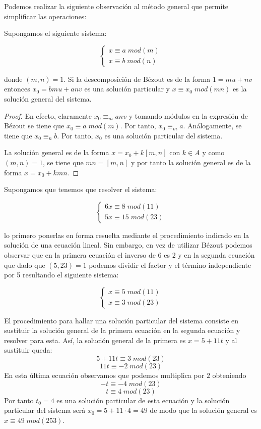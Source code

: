 Podemos realizar la siguiente observación al método general que permite simplificar las operaciones:

\begin{proposition}
Supongamos el siguiente sistema:

\[   
\begin{cases}
x \equiv a \; mod(m) \\
x \equiv b \; mod(n) 
\end{cases}
\]

donde $(m,n) = 1$. Si la descomposición de Bézout es de la forma $1 = mu + nv$ entonces $x_0 = bmu + anv$ es una solución particular y $x \equiv x_0 \; mod(mn)$ es la solución general del sistema. 
\end{proposition}
\begin{proof}
En efecto, claramente $x_0 \equiv_{m} anv$ y tomando módulos en la expresión de Bézout se tiene que $x_0 \equiv a \; mod(m)$. Por tanto, $x_0 \equiv_{m} a$. Análogamente, se tiene que $x_0 \equiv_{n} b$. Por tanto, $x_0$ es una solución particular del sistema. 

La solución general es de la forma $x = x_0 + k[m,n]$ con $k \in A$ y como $(m,n) = 1$, se tiene que $mn = [m,n]$ y por tanto la solución general es de la forma $x = x_0 + kmn$. 
\end{proof}

\begin{example}
Supongamos que tenemos que resolver el sistema:

\[   
\begin{cases}
6x \equiv 8 \; mod(11) \\
5x \equiv 15 \; mod(23) 
\end{cases}
\]

lo primero ponerlas en forma resuelta mediante el procedimiento indicado en la solución de una ecuación lineal. Sin embargo, en vez de utilizar Bézout podemos observar que en la primera ecuación el inverso de 6 es 2 y en la segunda ecuación que dado que $(5,23) = 1$ podemos dividir el factor y el término independiente por 5 resultando el siguiente sistema:

\[   
\begin{cases}
x \equiv 5 \; mod(11) \\
x \equiv 3 \; mod(23) 
\end{cases}
\]

El procedimiento para hallar una solución particular del sistema consiste en sustituir la solución general de la primera ecuación en la segunda ecuación y resolver para esta. Así, la solución general de la primera es $x = 5+11t$ y al sustituir queda: $$5+11t \equiv 3 \; mod(23)$$ $$11t \equiv -2 \; mod(23)$$ En esta última  ecuación observamos que podemos multiplica por $2$ obteniendo $$-t \equiv -4 \; mod(23)$$ $$t \equiv 4 \; mod(23)$$ Por tanto $t_0 = 4$ es una solución particular de esta ecuación y la solución particular del sistema será $x_0 = 5+11 \cdot 4 = 49$ de modo que la solución general es $x \equiv 49 \; mod(253)$. 

\end{example}

